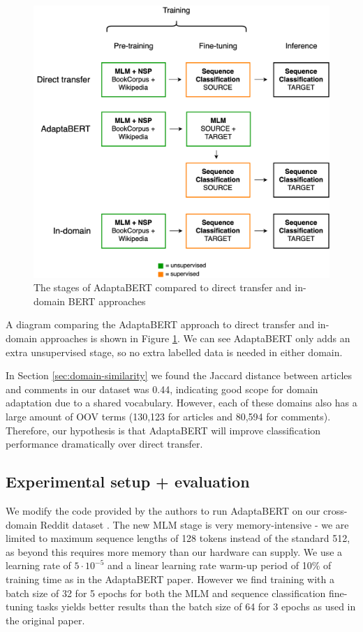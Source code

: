 \begin{figure}[ht]
    \centering
    \hspace{-1.5cm}
    \includegraphics[scale=0.29]{0-img/adaptabert.png}
    \caption{The stages of AdaptaBERT compared to direct transfer and in-domain BERT approaches}
    \label{fig:adaptabert}
\end{figure}

A diagram comparing the AdaptaBERT approach to direct transfer and in-domain approaches is shown in Figure \ref{fig:adaptabert}. We can see AdaptaBERT only adds an extra unsupervised stage, so no extra labelled data is needed in either domain.

In Section \ref{sec:domain-similarity} we found the Jaccard distance between articles and comments in our dataset was 0.44, indicating good scope for domain adaptation due to a shared vocabulary. However, each of these domains also has a large amount of OOV terms (130,123 for articles and 80,594 for comments). Therefore, our hypothesis is that AdaptaBERT will improve classification performance dramatically over direct transfer.

\subsection{Experimental setup + evaluation} \label{subsec:adaptabert-evaluation}

We modify the code provided by the authors to run AdaptaBERT on our cross-domain Reddit dataset \cite{adaptabert-code}. The new MLM stage is very memory-intensive - we are limited to maximum sequence lengths of 128 tokens instead of the standard 512, as beyond this requires more memory than our hardware can supply. We use a learning rate of $ 5 \cdot 10^{-5} $ and a linear learning rate warm-up period of 10\% of training time as in the AdaptaBERT paper. However we find training with a batch size of 32 for 5 epochs for both the MLM and sequence classification fine-tuning tasks yields better results than the batch size of 64 for 3 epochs as used in the original paper.

